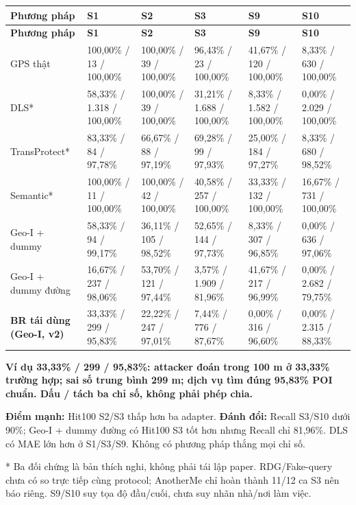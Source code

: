 \documentclass[10pt,a4paper]{article}
\newcommand{\key}[1]{\par\smallskip\noindent\colorbox{pale}{\parbox{\dimexpr\linewidth-2\fboxsep}{\textbf{#1}}}\par\smallskip}
\begin{document}
\begingroup\small
\begin{longtable}{@{}P{2.804cm}P{2.598cm}P{2.598cm}P{2.598cm}P{2.598cm}P{2.598cm}@{}}
\toprule
\textbf{Phương pháp} & \textbf{S1} & \textbf{S2} & \textbf{S3} & \textbf{S9} & \textbf{S10}\\\midrule
\endfirsthead
\toprule
\textbf{Phương pháp} & \textbf{S1} & \textbf{S2} & \textbf{S3} & \textbf{S9} & \textbf{S10}\\\midrule
\endhead
\bottomrule\endfoot
GPS thật & 100,00\% / 13 / 100,00\% & 100,00\% / 39 / 100,00\% & 96,43\% / 23 / 100,00\% & 41,67\% / 120 / 100,00\% & 8,33\% / 630 / 100,00\%\\
\addlinespace[3pt]
DLS* & 58,33\% / 1.318 / 100,00\% & 100,00\% / 39 / 100,00\% & 31,21\% / 1.688 / 100,00\% & 8,33\% / 1.582 / 100,00\% & 0,00\% / 2.029 / 100,00\%\\
\addlinespace[3pt]
TransProtect* & 83,33\% / 84 / 97,78\% & 66,67\% / 88 / 97,19\% & 69,28\% / 99 / 97,93\% & 25,00\% / 184 / 97,27\% & 8,33\% / 680 / 98,52\%\\
\addlinespace[3pt]
Semantic* & 100,00\% / 11 / 100,00\% & 100,00\% / 42 / 100,00\% & 40,58\% / 257 / 100,00\% & 33,33\% / 132 / 100,00\% & 16,67\% / 731 / 100,00\%\\
\addlinespace[3pt]
Geo-I + dummy & 58,33\% / 94 / 99,17\% & 36,11\% / 105 / 98,52\% & 52,65\% / 144 / 97,73\% & 8,33\% / 307 / 96,85\% & 0,00\% / 636 / 97,06\%\\
\addlinespace[3pt]
Geo-I + dummy đường & 16,67\% / 237 / 98,06\% & 53,70\% / 121 / 97,44\% & 3,57\% / 1.909 / 81,96\% & 41,67\% / 217 / 96,99\% & 0,00\% / 2.682 / 79,75\%\\
\addlinespace[3pt]
\textbf{BR tái dùng (Geo-I, v2)} & 33,33\% / 299 / 95,83\% & 22,22\% / 247 / 97,01\% & 7,44\% / 776 / 87,67\% & 0,00\% / 316 / 96,60\% & 0,00\% / 2.315 / 88,33\%\\
\end{longtable}
\endgroup
\key{Ví dụ 33,33\% / 299 / 95,83\%: attacker đoán trong 100 m ở 33,33\% trường hợp; sai số trung bình 299 m; dịch vụ tìm đúng 95,83\% POI chuẩn. Dấu / tách ba chỉ số, không phải phép chia.}

\textbf{Điểm mạnh:} Hit100 S2/S3 thấp hơn ba adapter. \textbf{Đánh đổi:} Recall S3/S10 dưới 90\%; Geo-I + dummy đường có Hit100 S3 tốt hơn nhưng Recall chỉ 81,96\%. DLS có MAE lớn hơn ở S1/S3/S9. Không có phương pháp thắng mọi chỉ số.

* Ba đối chứng là bản thích nghi, không phải tái lập paper. RDG/Fake-query chưa có so trực tiếp cùng protocol; AnotherMe chỉ hoàn thành 11/12 ca S3 nên báo riêng. S9/S10 suy tọa độ đầu/cuối, chưa suy nhãn nhà/nơi làm việc.
\end{document}
